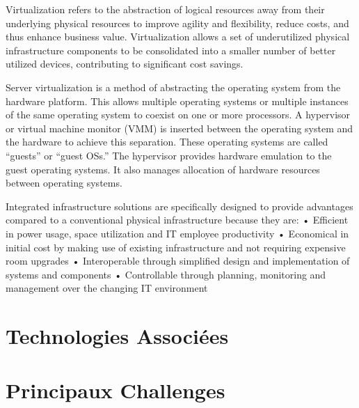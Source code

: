 Virtualization refers to the abstraction of logical resources away from their underlying physical resources to improve agility and flexibility, reduce costs, and thus enhance business value. Virtualization allows a set of underutilized physical infrastructure components to be consolidated into a smaller number of better utilized devices, contributing to significant cost savings.

Server virtualization is a method of abstracting the operating system from the hardware platform. This allows multiple operating systems or multiple instances of the same operating system to coexist on one or more processors. A hypervisor or virtual machine monitor (VMM) is inserted between the operating system and the hardware to achieve this separation. These operating systems are called “guests” or “guest OSs.” The hypervisor provides hardware emulation to the guest operating systems. It also manages allocation of hardware resources between operating systems.


Integrated infrastructure solutions are specifically designed to provide advantages compared to a conventional physical infrastructure because they are: 
•	 Efficient in power usage, space utilization and IT employee productivity
•	 Economical in initial cost by making use of existing infrastructure and not requiring expensive room upgrades
•	 Interoperable through simplified design and implementation of systems and components 
•	 Controllable through planning, monitoring and management over the changing IT environment

\section{Technologies Associées}

\section{Principaux Challenges}


